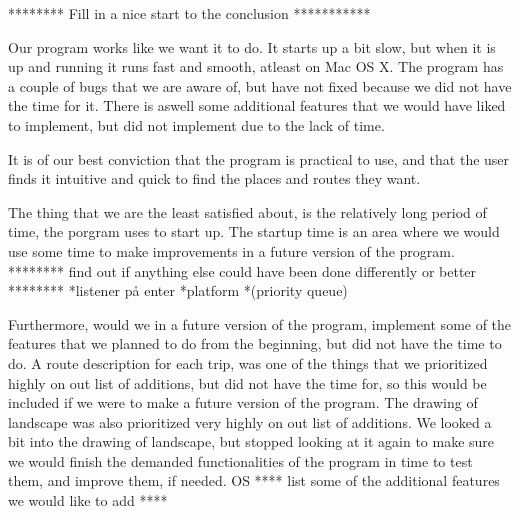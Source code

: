 ******** Fill in a nice start to the conclusion ***********

Our program works like we want it to do. It starts up a bit slow, but when it is up and running it runs fast and smooth, atleast on Mac OS X.
The program has a couple of bugs that we are aware of, but have not fixed because we did not have the time for it. There is aswell some additional features that we would have liked to implement, but did not implement due to the lack of time. 

It is of our best conviction that the program is practical to use, and that the user finds it intuitive and quick to find the places and routes they want. 

The thing that we are the least satisfied about, is the relatively long period of time, the porgram uses to start up. The startup time is an area where we would use some time to make improvements in a future version of the program. 
******** find out if anything else could have been done differently or better ******** 
*listener på enter
*platform
*(priority queue)


Furthermore, would we in a future version of the program, implement some of the features that we planned to do from the beginning, but did not have the time to do. A route description for each trip, was one of the things that we prioritized highly on out list of additions, but did not have the time for, so this would be included if we were to make a future version of the program. 
The drawing of landscape was also prioritized very highly on out list of additions. We looked a bit into the drawing of landscape, but stopped looking at it again to make sure we would finish the demanded functionalities of the program in time to test them, and improve them, if needed.
OS
**** list some of the additional features we would like to add ****

